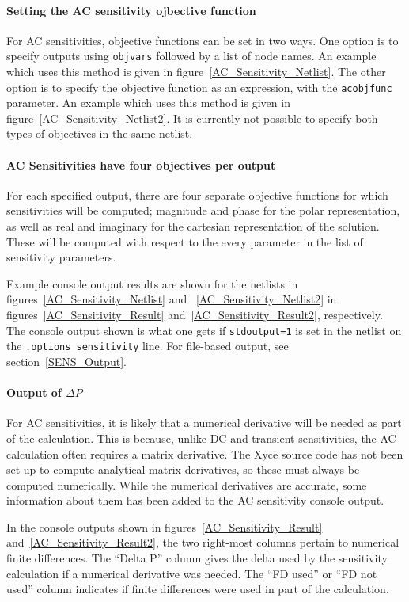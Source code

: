\paragraph{Setting the AC sensitivity ojbective function}
For AC sensitivities, objective functions can be set in two ways.  One option is to 
specify outputs using \texttt{objvars} followed by a list of node names.      
An example which  uses this method is given in figure~\ref{AC_Sensitivity_Netlist}.  
The other option is to specify the objective function as an expression, with 
the \texttt{acobjfunc} parameter.  
An example which  uses this method is given in figure~\ref{AC_Sensitivity_Netlist2}.  
It is currently not  possible to specify both types of objectives in the same netlist.

\paragraph{AC Sensitivities have four objectives per output}
For each specified output, there are four separate objective functions
for which sensitivities will be computed; magnitude and phase for the
polar representation, as well as real and imaginary for the cartesian
representation of the solution.   These will be computed with respect to 
the every parameter in the list of sensitivity parameters.   

Example console output results are shown for the netlists in figures~\ref{AC_Sensitivity_Netlist} 
and ~\ref{AC_Sensitivity_Netlist2} in figures~\ref{AC_Sensitivity_Result} 
and~\ref{AC_Sensitivity_Result2}, respectively.  The console output shown is what one gets 
if \texttt{stdoutput=1} is set in the netlist on the \texttt{.options sensitivity} line.
For file-based output, see section~\ref{SENS_Output}.  

\paragraph{Output of $\Delta P$}
For AC sensitivities, it is likely that a numerical derivative will be needed
as part of the calculation.  This is because, unlike DC and transient 
sensitivities, the AC calculation often requires a matrix derivative.  
The Xyce source code has not been set up to compute analytical matrix 
derivatives, so these must always be computed numerically.
While the numerical derivatives are accurate, some information about 
them has been added to the AC sensitivity console output.

In the console outputs shown in figures~\ref{AC_Sensitivity_Result} 
and~\ref{AC_Sensitivity_Result2}, the two right-most columns
pertain to numerical finite differences.  The ``Delta P'' column 
gives the delta used by the sensitivity calculation if a numerical derivative was needed.   
The ``FD used'' or ``FD not used'' column indicates if finite differences were used 
in part of the calculation.    

